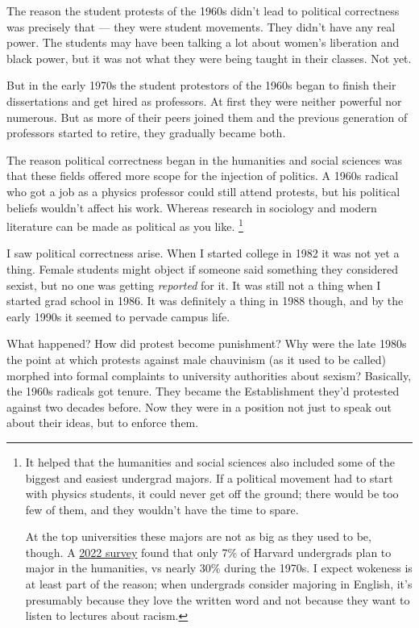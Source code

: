 The reason the student protests of the 1960s didn't lead to political
correctness was precisely that --- they were student movements. They
didn't have any real power. The students may have been talking a lot
about women's liberation and black power, but it was not what they were
being taught in their classes. Not yet.

But in the early 1970s the student protestors of the 1960s began to
finish their dissertations and get hired as professors. At first they
were neither powerful nor numerous. But as more of their peers joined
them and the previous generation of professors started to retire, they
gradually became both.

The reason political correctness began in the humanities and social
sciences was that these fields offered more scope for the injection of
politics. A 1960s radical who got a job as a physics professor could
still attend protests, but his political beliefs wouldn't affect his
work. Whereas research in sociology and modern literature can be made as
political as you like. \footnote{It helped that the humanities and social sciences also included
some of the biggest and easiest undergrad majors. If a political
movement had to start with physics students, it could never get off the
ground; there would be too few of them, and they wouldn't have the time
to spare.

At the top universities these majors are not as big as they used to be,
though. A
\href{https://www.newyorker.com/magazine/2023/03/06/the-end-of-the-english-major}{2022
survey} found that only 7\% of Harvard undergrads plan to major in the
humanities, vs nearly 30\% during the 1970s. I expect wokeness is at
least part of the reason; when undergrads consider majoring in English,
it's presumably because they love the written word and not because they
want to listen to lectures about racism.}

I saw political correctness arise. When I started college in 1982 it was
not yet a thing. Female students might object if someone said something
they considered sexist, but no one was getting \emph{reported} for it.
It was still not a thing when I started grad school in 1986. It was
definitely a thing in 1988 though, and by the early 1990s it seemed to
pervade campus life.

What happened? How did protest become punishment? Why were the late
1980s the point at which protests against male chauvinism (as it used to
be called) morphed into formal complaints to university authorities
about sexism? Basically, the 1960s radicals got tenure. They became the
Establishment they'd protested against two decades before. Now they were
in a position not just to speak out about their ideas, but to enforce
them.

